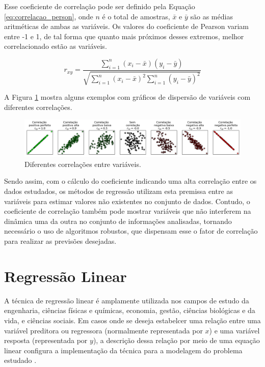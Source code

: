 Esse coeficiente de correlação pode ser definido pela Equação \ref{eq:correlacao_person}, onde $n$ é o total de amostras, $\bar{x}$ e $\bar{y}$ são as médias aritméticas de ambas as variáveis. Os valores do coeficiente de Pearson variam entre -1 e 1, de tal forma que quanto mais próximos desses extremos, melhor correlacionado estão as variáveis.

\begin{equation}
    r_{xy} = \frac{\sum_{i=1}^n (x_i - \bar{x})(y_i - \bar{y})}{\sqrt{\sum_{i=1}^n (x_i - \bar{x})^2 \sum_{i=1}^n (y_i - \bar{y})^2}}
    \label{eq:correlacao_person}
\end{equation}

A Figura \ref{fig:correlacoes} mostra alguns exemplos com gráficos de dispersão de variáveis com diferentes correlações.

\begin{figure}[H]
	\caption{\label{fig:correlacoes}Diferentes correlações entre variáveis.}
	\begin{center}
		\includegraphics[scale=0.4]{figuras/correlations.png}
	\end{center}
\end{figure}

Sendo assim, com o cálculo do coeficiente indicando uma alta correlação entre os dados estudados, os métodos de regressão utilizam esta premissa entre as variáveis para estimar valores não existentes no conjunto de dados. Contudo, o coeficiente de correlação também pode mostrar variáveis que não interferem na dinâmica uma da outra no conjunto de informações analisadas, tornando necessário o uso de algoritmos robustos, que dispensam esse o fator de correlação para realizar as previsões desejadas. 

\section{Regressão Linear}
\label{sec:regressao-linear}

A técnica de regressão linear é amplamente utilizada nos campos de estudo da engenharia, ciências físicas e químicas, economia, gestão, ciências biológicas e da vida, e ciências sociais. Em casos onde se deseja estabelcer uma relação entre uma variável preditora ou regressora (normalmente representada por $x$) e uma variável resposta (representada por $y$), a descrição dessa relação por meio de uma equação linear configura a implementação da técnica para a modelagem do problema estudado \cite{montgomery2012}.  

